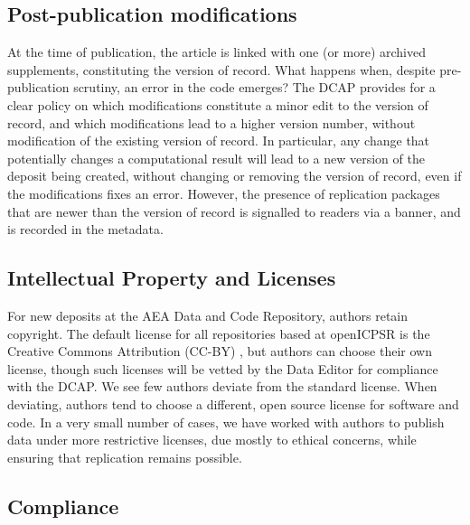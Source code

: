 \documentclass[PP]{AEA}
\newcommand{\aeadcr}{AEA Data and Code Repository}
\begin{document}
\subsection{Post-publication modifications}

At the time of publication, the article is linked with one (or more) archived supplements, constituting the version of record. What happens when, despite pre-publication scrutiny, an error in the code emerges? The \ac{DCAP} provides for a clear policy on which modifications constitute a minor edit to the version of record, and which modifications lead to a higher version number, without modification of the existing version of record. In particular, any change that potentially changes a computational result will lead to a new version of the deposit being created, without changing or removing the version of record, even if the modifications fixes an error. However, the presence of replication packages that are newer than the version of record is signalled to readers via a banner, and is recorded in the metadata.

\subsection{Intellectual Property and Licenses} 
\label{sec:ip}

For new deposits at the \aeadcr{}, authors retain  copyright. The default license for all repositories based at openICPSR is the  Creative Commons Attribution (CC-BY) \citep{CreativeCommons2017}, but authors can choose their own license,  though such licenses will be vetted by the Data Editor for compliance with the \ac{DCAP}. We see few authors deviate from the standard license. When deviating, authors tend to choose a different, open source license \citep{OpenSourceInitiative2018} for software and code. In a very small number of cases, we have worked with authors to publish data under more restrictive licenses, due mostly to ethical concerns, while ensuring that replication remains possible.


\subsection{Compliance}
\label{sec:compliance}
\end{document}

